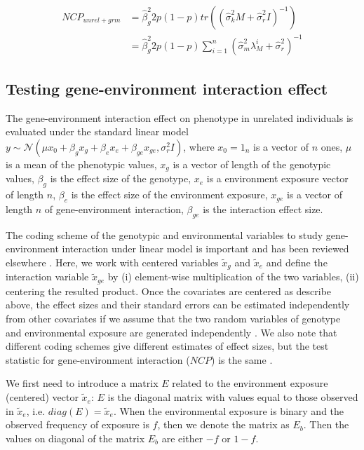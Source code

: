 \documentclass[]{book}
\theoremstyle{definition}
\theoremstyle{definition}
\theoremstyle{definition}
\theoremstyle{remark}
\begin{document}
\begin{equation} 
\begin{split}
NCP_{unrel+grm} & = \hat{\beta}_g^2 2 p (1 - p) tr( (\hat{\sigma}_k^2 M + \hat{\sigma}_r^2 I)^{-1} )  \\
 & = \hat{\beta}_g^2 2 p (1 - p) \sum_{i=1}^{n}{(\hat{\sigma}_m^2 \lambda_{M}^i + \hat{\sigma}_r^2)^{-1}}
\end{split}
\label{eq:ncpggrm}
\end{equation}

\subsection{Testing gene-environment interaction
effect}\label{testing-gene-environment-interaction-effect}

The gene-environment interaction effect on phenotype in unrelated
individuals is evaluated under the standard linear model
\(y \sim \mathcal{N} (\mu x_0 + \beta_g x_g + \beta_e x_e + \beta_{ge} x_{ge}, \sigma_r^2 I)\),
where \(x_0 = 1_n\) is a vector of \(n\) ones, \(\mu\) is a mean of the
phenotypic values, \(x_g\) is a vector of length of the genotypic
values, \(\beta_g\) is the effect size of the genotype, \(x_e\) is a
environment exposure vector of length \(n\), \(\beta_e\) is the effect
size of the environment exposure, \(x_{ge}\) is a vector of length \(n\)
of gene-environment interaction, \(\beta_{ge}\) is the interaction
effect size.

The coding scheme of the genotypic and environmental variables to study
gene-environment interaction under linear model is important and has
been reviewed elsewhere \citep{Aschard2016}. Here, we work with centered
variables \(\tilde{x}_g\) and \(\tilde{x}_e\) and define the interaction
variable \(\tilde{x}_{ge}\) by (i) element-wise multiplication of the
two variables, (ii) centering the resulted product. Once the covariates
are centered as describe above, the effect sizes and their standard
errors can be estimated independently from other covariates if we assume
that the two random variables of genotype and environmental exposure are
generated independently \citep[Appendix C]{Aschard2016}. We also note
that different coding schemes give different estimates of effect sizes,
but the test statistic for gene-environment interaction (\(NCP\)) is the
same \citep[Appendix B]{Aschard2016}.

We first need to introduce a matrix \(E\) related to the environment
exposure (centered) vector \(\tilde{x}_e\): \(E\) is the diagonal matrix
with values equal to those observed in \(\tilde{x}_e\), i.e.
\(diag(E) = \tilde{x}_e\). When the environmental exposure is binary and
the observed frequency of exposure is \(f\), then we denote the matrix
as \(E_b\). Then the values on diagonal of the matrix \(E_b\) are either
\(-f\) or \(1 - f\).
\end{document}

